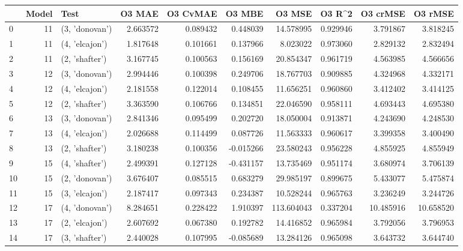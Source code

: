 \begin{tabular}{lrlrrrrrrr}
\toprule
{} &  Model &            Test &    O3 MAE &  O3 CvMAE &    O3 MBE &      O3 MSE &    O3 R\textasciicircum2 &   O3 crMSE &    O3 rMSE \\
\midrule
0  &     11 &  (3, 'donovan') &  2.663572 &  0.089432 &  0.448039 &   14.578995 &  0.929946 &   3.791867 &   3.818245 \\
1  &     11 &  (4, 'elcajon') &  1.817648 &  0.101661 &  0.137966 &    8.023022 &  0.973060 &   2.829132 &   2.832494 \\
2  &     11 &  (2, 'shafter') &  3.167745 &  0.100563 &  0.156169 &   20.854347 &  0.961719 &   4.563985 &   4.566656 \\
3  &     12 &  (3, 'donovan') &  2.994446 &  0.100398 &  0.249706 &   18.767703 &  0.909885 &   4.324968 &   4.332171 \\
4  &     12 &  (4, 'elcajon') &  2.181558 &  0.122014 &  0.108455 &   11.656251 &  0.960860 &   3.412402 &   3.414125 \\
5  &     12 &  (2, 'shafter') &  3.363590 &  0.106766 &  0.134851 &   22.046590 &  0.958111 &   4.693443 &   4.695380 \\
6  &     13 &  (3, 'donovan') &  2.841346 &  0.095499 &  0.202720 &   18.050004 &  0.913871 &   4.243690 &   4.248530 \\
7  &     13 &  (4, 'elcajon') &  2.026688 &  0.114499 &  0.087726 &   11.563333 &  0.960617 &   3.399358 &   3.400490 \\
8  &     13 &  (2, 'shafter') &  3.180238 &  0.100356 & -0.015266 &   23.580243 &  0.956228 &   4.855925 &   4.855949 \\
9  &     15 &  (4, 'shafter') &  2.499391 &  0.127128 & -0.431157 &   13.735469 &  0.951174 &   3.680974 &   3.706139 \\
10 &     15 &  (2, 'donovan') &  3.676407 &  0.085515 &  0.683279 &   29.985197 &  0.899675 &   5.433077 &   5.475874 \\
11 &     15 &  (3, 'elcajon') &  2.187417 &  0.097343 &  0.234387 &   10.528244 &  0.965763 &   3.236249 &   3.244726 \\
12 &     17 &  (4, 'donovan') &  8.284651 &  0.228422 &  1.910397 &  113.604043 &  0.337204 &  10.485916 &  10.658520 \\
13 &     17 &  (2, 'elcajon') &  2.607692 &  0.067380 &  0.192782 &   14.416852 &  0.965984 &   3.792056 &   3.796953 \\
14 &     17 &  (3, 'shafter') &  2.440028 &  0.107995 & -0.085689 &   13.284126 &  0.965098 &   3.643732 &   3.644740 \\

\end{tabular}
